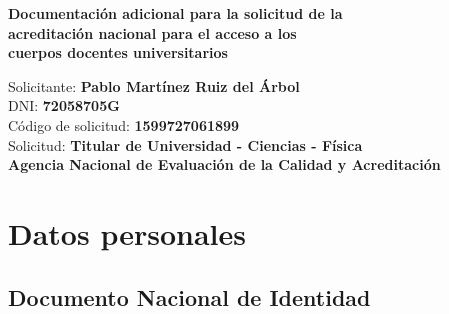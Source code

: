 \documentclass[a4paper, 11pt, twoside, openright]{report}
\begin{document}

\begin{titlepage}

	\vspace*{5.5cm}
	\centering

	{\huge\bfseries Documentación adicional para la solicitud de la \\ \vspace*{1cm}
	                acreditación nacional para el acceso a los\\ \vspace*{1cm}
                        cuerpos docentes universitarios}
	
	\begin{flushleft}
	
	\vspace{6.6cm}
	{\Large Solicitante: \textbf{Pablo Martínez Ruiz del Árbol}\\}
	{\Large DNI: \textbf{72058705G}\\}
	{\Large Código de solicitud: \textbf{1599727061899}\\}
	{\Large Solicitud: \textbf{Titular de Universidad - Ciencias - Física}\\}
	{\Large \textbf{Agencia Nacional de Evaluación de la Calidad y Acreditación}}
	\vfill
	
	\end{flushleft}

\end{titlepage}

\tableofcontents
\clearpage
\thispagestyle{empty}
\phantom{a}
\vfill
\newpage


\setcounter{page}{1}

\renewcommand\thechapter{\arabic{chapter}}
\renewcommand\thesection{\thechapter.\Alph{section}}
\renewcommand\thesubsection{\thesection.\arabic{subsection}}
\renewcommand\thesubsubsection{\thesubsection.\arabic{subsubsection}}


\chapter{Datos personales}
\section{Documento Nacional de Identidad}

\end{document}
